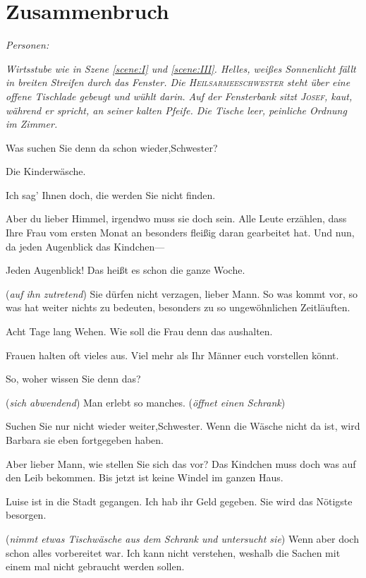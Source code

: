 \documentclass[
	final,
	a4paper,
	ngerman,
	mpinclude = true, %
	twoside = true,
	open = right,
	cleardoublepage = plain,
	DIV = 13,
	BCOR = 1cm,
	titlepage = firstiscover,
	]{scrbook}
\newcommand{\marginnote}[1]{\marginpar{\singlespacing\raggedright\footnotesize#1}}
\newcommand{\scene}{\setcounter{subscene}{1}\section}
\newcommand{\direction}[1]{(\textit{#1})}
\newcommand{\setting}[1]{\vspace{-0.5\baselineskip}\centering\textit{#1}}
\newcounter{subscene}
\newcommand{\characterlist}[1]{{\begin{center}\textit{Personen:}\quad{}#1\end{center}}}
\newcommand{\thecharacter}[1]{\textup{\textsc{#1}}\xspace}
\newcommand{\theJosef}{\thecharacter{Josef}}
\newcommand{\theHeilsarmeeschwester}{\thecharacter{Heilsarmeeschwester}}
\newcommand{\character}[1]{\item[#1]}
\newcommand{\Josef}{\character{\theJosef}}
\newcommand{\Heilsarmeeschwester}{\character{Schwester}}
\begin{document}


\scene{Zusammenbruch}
\label{scene:VII}
\characterlist{}
\setting{Wirtsstube wie in Szene \ref{scene:I} und \ref{scene:III}. Helles, weißes Sonnenlicht fällt in breiten Streifen durch das Fenster. Die \theHeilsarmeeschwester steht über eine offene Tischlade gebeugt und wühlt darin. Auf der Fensterbank sitzt \theJosef, kaut, während er spricht, an seiner kalten Pfeife. Die Tische leer, peinliche Ordnung im Zimmer.}

\begin{play}

\Josef
Was suchen Sie denn da schon wieder,Schwester?

\Heilsarmeeschwester
Die Kinderwäsche.

\Josef
Ich sag' Ihnen doch, die werden Sie nicht finden.

\Heilsarmeeschwester
Aber du lieber Himmel, irgendwo muss sie doch sein. Alle Leute erzählen, dass Ihre Frau vom ersten Monat an besonders fleißig daran gearbeitet hat. Und nun, da jeden Augenblick das Kindchen---

\Josef
Jeden Augenblick! Das heißt es schon die ganze Woche.

\Heilsarmeeschwester
\marginnote{Zeitabschnitten}
\direction{auf ihn zutretend} Sie dürfen nicht verzagen, lieber Mann. So was kommt vor, so was hat weiter nichts zu bedeuten, besonders zu so ungewöhnlichen Zeitläuften.

\Josef
Acht Tage lang Wehen. Wie soll die Frau denn das aushalten.

\Heilsarmeeschwester
Frauen halten oft vieles aus. Viel mehr als Ihr Männer euch vorstellen könnt.

\Josef
So, woher wissen Sie denn das?

\Heilsarmeeschwester
\direction{sich abwendend} Man erlebt so manches. \direction{öffnet einen Schrank}

\Josef
Suchen Sie nur nicht wieder weiter,Schwester. Wenn die Wäsche nicht da ist, wird Barbara sie eben fortgegeben haben.

\Heilsarmeeschwester
Aber lieber Mann, wie stellen Sie sich das vor? Das Kindchen muss doch was auf den Leib bekommen. Bis jetzt ist keine Windel im ganzen Haus.

\Josef
Luise ist in die Stadt gegangen. Ich hab ihr Geld gegeben. Sie wird das Nötigste besorgen.

\Heilsarmeeschwester
\direction{nimmt etwas Tischwäsche aus dem Schrank und untersucht sie} Wenn aber doch schon alles vorbereitet war. Ich kann nicht verstehen, weshalb die Sachen mit einem mal nicht gebraucht werden sollen.


\end{play}
\end{document}
